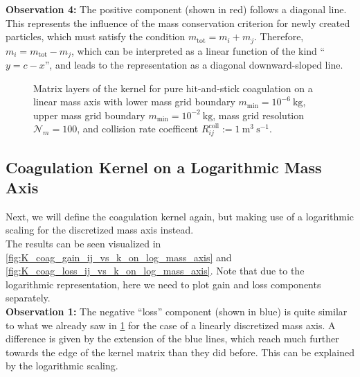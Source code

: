         \textbf{Observation 4:} The positive component (shown in red) follows a diagonal line. 
        This represents the influence of the mass conservation criterion for newly created 
        particles, which must satisfy the condition $m_\text{tot} = m_i + m_j$. 
        Therefore, $m_i = m_\text{tot} - m_j$, which can be interpreted as a linear function 
        of the kind ``$y = c - x$'', and leads to the representation as a diagonal
        downward-sloped line. \\

    \clearpage

        \begin{figure}[h!]
            \makebox[\textwidth]{
                \texttt{[image: 101/Kkij vs k, coag=True, frag=False.pdf]}
            }
            \caption{ 
                Matrix layers of the kernel for pure hit-and-stick coagulation on a linear mass 
                axis with 
                lower mass grid boundary $m_\text{min}=10^{-6}\ \text{kg}$, 
                upper mass grid boundary $m_\text{min}=10^{-2}\ \text{kg}$, 
                mass grid resolution $\mathcal N_m=100$, and 
                collision rate coefficent $R_{ij}^\text{coll} := 1\ \text{m}^3\ \text{s}^{-1}$.
            }
            \label{fig:K_coag_ij_vs_k_on_linear_mass_axis}
        \end{figure}

    \subsection{Coagulation Kernel on a Logarithmic Mass Axis}

        Next, we will define the coagulation kernel again, but making use of a logarithmic 
        scaling for the discretized mass axis instead. \\

        The results can be seen visualized in \cref{fig:K_coag_gain_ij_vs_k_on_log_mass_axis} 
        and \cref{fig:K_coag_loss_ij_vs_k_on_log_mass_axis}. Note that due to the logarithmic
        representation, here we need to plot gain and loss components separately. \\

        \textbf{Observation 1:} The negative ``loss'' component (shown in blue) is quite similar to 
        what we already saw in \cref{fig:K_coag_ij_vs_k_on_linear_mass_axis} for the case of a 
        linearly discretized mass axis. A difference is given by the extension of the blue lines, 
        which reach much further towards the edge of the kernel matrix than they did before.
        This can be explained by the logarithmic scaling. \\

